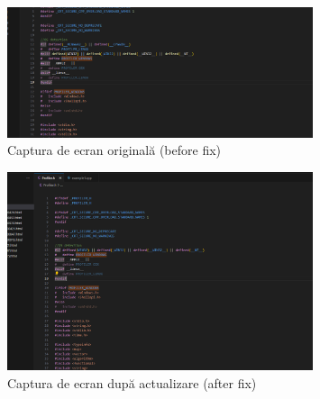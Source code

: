 \documentclass[../ro-fa-lab.tex]{subfiles}
\begin{document}
\begin{figure}[htbp]
    \centering
    \includegraphics[width=0.8\textwidth]{./Resources/error_fix/image2.png}
    \caption{Captura de ecran originală (before fix)}
    \label{fig:error2}
\end{figure}

\begin{figure}[htbp]
    \centering
    \includegraphics[width=0.8\textwidth]{./Resources/error_fix/image3.png}
    \caption{Captura de ecran după actualizare (after fix)}
    \label{fig:error3}
\end{figure}
\end{document}
